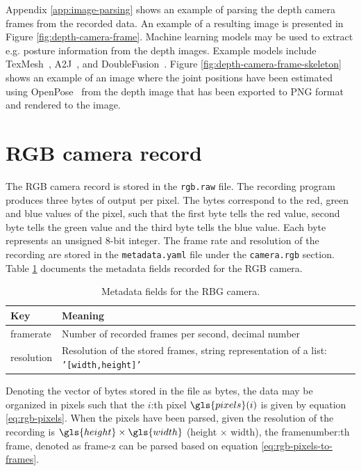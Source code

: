 Appendix \ref{app:image-parsing} shows an example of parsing the depth camera frames from the recorded data.
An example of a resulting image is presented in Figure \ref{fig:depth-camera-frame}.
Machine learning models may be used to extract e.g. posture information from the depth images.
Example models include TexMesh~\cite{tex-mesh}, A2J~\cite{a2j}, and DoubleFusion~\cite{double-fusion}.
Figure \ref{fig:depth-camera-frame-skeleton} shows an example of an image where the joint positions have been estimated using
OpenPose~\cite{openpose} from the depth image that has been exported to PNG format and rendered to the image.

\section{RGB camera record}
\label{sec:rgb-file}
The RGB camera record is stored in the \texttt{rgb.raw} file.
The recording program produces three bytes of output per pixel. 
The bytes correspond to the red, green and blue values of the pixel,
such that the first byte tells the red value,
second byte tells the green value and the third byte tells the blue value.
Each byte represents an unsigned 8-bit integer.
The frame rate and resolution of the recording are stored in the \texttt{metadata.yaml} file
under the \texttt{camera.rgb} section.
Table \ref{tab:rgb-metadata} documents the metadata fields recorded for the RGB camera.

\begin{table}
    \begin{tabular}{l l}
        \toprule
        \textbf{Key} & \textbf{Meaning} \\
        \midrule
        framerate & Number of recorded frames per second, decimal number \\
        resolution & Resolution of the stored frames, string representation of a list: \texttt{'[\gls{width},\gls{height}]'} \\
        \bottomrule
    \end{tabular}
    \caption{Metadata fields for the RBG camera.}
    \label{tab:rgb-metadata}
\end{table}

Denoting the vector of bytes stored in the file as \gls{bytes},
the data may be organized in pixels such that the $i$:th pixel $\gls{pixels}(i)$ is given by equation \ref{eq:rgb-pixels}.
When the pixels have been parsed, given the resolution of the recording is $\gls{height} \times \gls{width}$ (height $\times$ width),
the \gls{framenumber}:th frame, denoted as \gls{frame-z} can be parsed based on equation \ref{eq:rgb-pixels-to-frames}.

